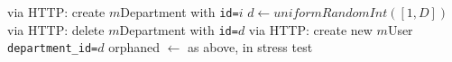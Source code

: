 \begin{algorithm}[H]
\begin{algorithmic}
    \State via HTTP: create $m$Department with \texttt{id=$i$}
  \EndFor
      \State $d \gets uniformRandomInt([1, D])$
        \State via HTTP: delete $m$Department with \texttt{id=$d$}
      \Else
        \State via HTTP: create new $m$User \texttt{department\_id=$d$}
      \EndIf        
   \EndParFor
   \State orphaned $\gets $ as above, in stress test
\EndFor
\end{algorithmic}
\end{algorithm}
